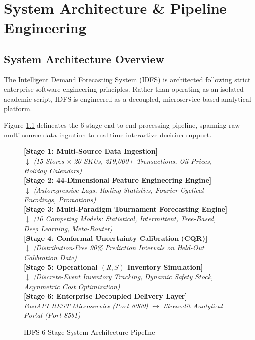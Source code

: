 \documentclass[12pt,a4paper,oneside]{report}
\theoremstyle{definition}
\begin{document}
\newpage
\chapter{System Architecture \& Pipeline Engineering}

\section{System Architecture Overview}
The Intelligent Demand Forecasting System (IDFS) is architected following strict enterprise software engineering principles. Rather than operating as an isolated academic script, IDFS is engineered as a decoupled, microservice-based analytical platform.

Figure \ref{fig:arch_flow} delineates the 6-stage end-to-end processing pipeline, spanning raw multi-source data ingestion to real-time interactive decision support.

\begin{figure}[H]
\centering
\begin{tcolorbox}[colback=blue!5!white,colframe=blue!75!black,title=\textbf{IDFS End-to-End Pipeline Workflow}]
\centering
\vspace{0.2cm}
\textbf{[Stage 1: Multi-Source Data Ingestion]} \\
$\downarrow$ \textit{(15 Stores $\times$ 20 SKUs, 219,000+ Transactions, Oil Prices, Holiday Calendars)} \\[0.2cm]
\textbf{[Stage 2: 44-Dimensional Feature Engineering Engine]} \\
$\downarrow$ \textit{(Autoregressive Lags, Rolling Statistics, Fourier Cyclical Encodings, Promotions)} \\[0.2cm]
\textbf{[Stage 3: Multi-Paradigm Tournament Forecasting Engine]} \\
$\downarrow$ \textit{(10 Competing Models: Statistical, Intermittent, Tree-Based, Deep Learning, Meta-Router)} \\[0.2cm]
\textbf{[Stage 4: Conformal Uncertainty Calibration (CQR)]} \\
$\downarrow$ \textit{(Distribution-Free 90\% Prediction Intervals on Held-Out Calibration Data)} \\[0.2cm]
\textbf{[Stage 5: Operational $(R, S)$ Inventory Simulation]} \\
$\downarrow$ \textit{(Discrete-Event Inventory Tracking, Dynamic Safety Stock, Asymmetric Cost Optimization)} \\[0.2cm]
\textbf{[Stage 6: Enterprise Decoupled Delivery Layer]} \\
\textit{FastAPI REST Microservice (Port 8000)} $\longleftrightarrow$ \textit{Streamlit Analytical Portal (Port 8501)}
\vspace{0.2cm}
\end{tcolorbox}
\caption{IDFS 6-Stage System Architecture Pipeline}
\label{fig:arch_flow}
\end{figure}
\end{document}

